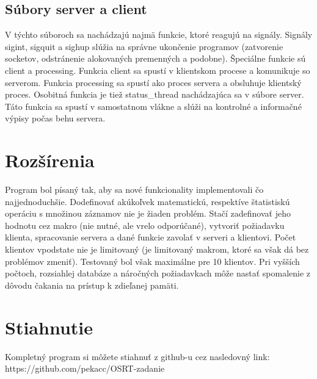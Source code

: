 \documentclass{article}
\begin{document}
\subsection{Súbory server a client}
V týchto súboroch sa nachádzajú najmä funkcie, ktoré reagujú na signály. Signály sigint, sigquit
a sighup slúžia na správne ukončenie programov (zatvorenie socketov, odstránenie alokovaných premenných
a podobne). Špeciálne funkcie sú client a processing. Funkcia client sa spustí v klientskom procese
a komunikuje so serverom. Funkcia processing sa spustí ako proces servera a obsluhuje klientský proces.
\newline
Osobitná funkcia je tiež status\_thread nachádzajúca sa v súbore server. Táto funkcia sa spustí v 
samostatnom vlákne a slúži na kontrolné a informačné výpisy počas behu servera.

\section{Rozšírenia}
Program bol písaný tak, aby sa nové funkcionality implementovali čo najjednoduchšie. Dodefinovať 
akúkoľvek matematickú, respektíve štatistiskú operáciu s množinou záznamov nie je žiaden problém.
Stačí zadefinovať jeho hodnotu cez makro (nie nutné, ale vrelo odporúčané), vytvoriť požiadavku 
klienta, spracovanie servera a dané funkcie zavolať v serveri a klientovi.
\newline
Počet klientov vpodstate nie je limitovaný (je limitovaný makrom, ktoré sa však dá bez problémov
zmeniť). Testovaný bol však maximálne pre 10 klientov. Pri vyšších počtoch, rozsiahlej databáze a 
náročných požiadavkach môže nastať spomalenie z dôvodu čakania na prístup k zdieľanej pamäti.

\section{Stiahnutie}
Kompletný program si môžete stiahnuť z github-u cez nasledovný link:
\newline
https://github.com/pekacc/OSRT-zadanie
\end{document}
